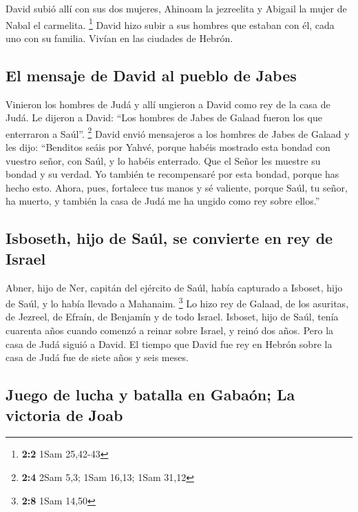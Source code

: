 \begin{paracol}{2}
 David subió allí con sus dos mujeres, Ahinoam la
jezreelita y Abigail la mujer de Nabal el carmelita. \footnote{\textbf{2:2}
  1Sam 25,42-43}  David hizo subir a sus hombres que
estaban con él, cada uno con su familia. Vivían en las ciudades de
Hebrón.

\hypertarget{el-mensaje-de-david-al-pueblo-de-jabes}{%
\subsection{El mensaje de David al pueblo de
Jabes}\label{el-mensaje-de-david-al-pueblo-de-jabes}}

 Vinieron los hombres de Judá y allí ungieron a David como
rey de la casa de Judá. Le dijeron a David: ``Los hombres de Jabes de
Galaad fueron los que enterraron a Saúl''. \footnote{\textbf{2:4} 2Sam
  5,3; 1Sam 16,13; 1Sam 31,12}  David envió mensajeros a
los hombres de Jabes de Galaad y les dijo: ``Benditos seáis por Yahvé,
porque habéis mostrado esta bondad con vuestro señor, con Saúl, y lo
habéis enterrado.  Que el Señor les muestre su bondad y su
verdad. Yo también te recompensaré por esta bondad, porque has hecho
esto.  Ahora, pues, fortalece tus manos y sé valiente,
porque Saúl, tu señor, ha muerto, y también la casa de Judá me ha ungido
como rey sobre ellos.''

\hypertarget{isboseth-hijo-de-sauxfal-se-convierte-en-rey-de-israel}{%
\subsection{Isboseth, hijo de Saúl, se convierte en rey de
Israel}\label{isboseth-hijo-de-sauxfal-se-convierte-en-rey-de-israel}}

 Abner, hijo de Ner, capitán del ejército de Saúl, había
capturado a Isboset, hijo de Saúl, y lo había llevado a Mahanaim.
\footnote{\textbf{2:8} 1Sam 14,50}  Lo hizo rey de Galaad,
de los asuritas, de Jezreel, de Efraín, de Benjamín y de todo Israel.
 Isboset, hijo de Saúl, tenía cuarenta años cuando
comenzó a reinar sobre Israel, y reinó dos años. Pero la casa de Judá
siguió a David.  El tiempo que David fue rey en Hebrón
sobre la casa de Judá fue de siete años y seis meses.

\hypertarget{juego-de-lucha-y-batalla-en-gabauxf3n-la-victoria-de-joab}{%
\subsection{Juego de lucha y batalla en Gabaón; La victoria de
Joab}\label{juego-de-lucha-y-batalla-en-gabauxf3n-la-victoria-de-joab}}


\end{paracol}
